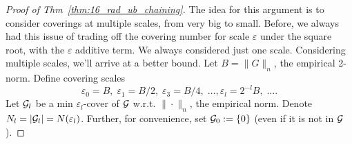 \documentclass[twoside]{article}
\begin{document}
\begin{proof}[Proof of Thm~\ref{thm:16_rad_ub_chaining}]
    The idea for this argument is to consider coverings at multiple scales, from very big to small.
    Before, we always had this issue of trading off the covering number for scale $\varepsilon$ under the square root, with the $\varepsilon$ additive term. We always considered just one scale. Considering multiple scales, we'll arrive at a better bound.
    Let $B = \| G \|_n$, the empirical 2-norm. Define covering scales
    \begin{equation*}
        \varepsilon_0 = B, \; \varepsilon_1 = B/2,  \; \varepsilon_3 = B/4, \; \dotsc, \varepsilon_l = 2^{-l} B, \; \dotsc.
    \end{equation*}
    Let $\mathcal{G}_l$ be a min $\varepsilon_l$-cover of $\mathcal{G}$ w.r.t. $\| \cdot \|_n$, the empirical norm. Denote $N_l = | \mathcal{G}_l | = N(\varepsilon_l)$. Further, for convenience, set $\mathcal{G}_0 := \{0\}$ (even if it is not in $\mathcal{G}$).


\end{proof}
\end{document}
